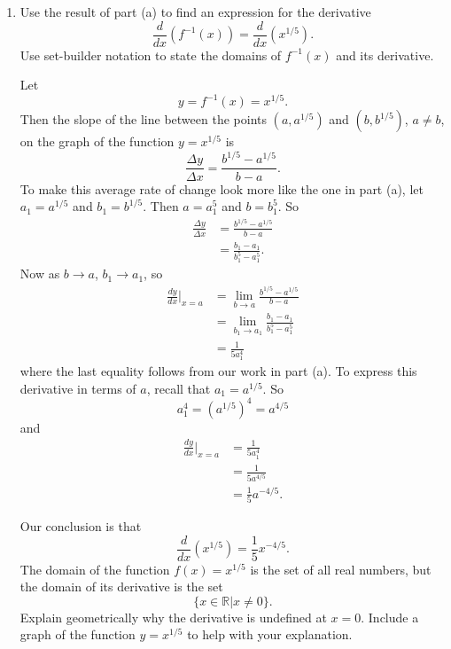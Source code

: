 \documentclass{ximera}
\begin{document}
\begin{question}
\begin{enumerate}
\item Use the result of part (a) to find an expression for the derivative
\[
    \frac{d}{dx}(f^{-1}(x)) =   \frac{d}{dx}\left( x^{1/5} \right) .
\]
Use set-builder notation to state the domains of $f^{-1}(x)$ and its derivative. 

\begin{explanation} 
Let
\[
        y = f^{-1}(x) =  x^{1/5}.
\] 
Then the slope of the line between the points $(a, a^{1/5})$ and $(b, b^{1/5})$, $a\neq b$, on the graph of the function $y=x^{1/5}$ is
\[
          \frac{\Delta y}{\Delta x} = \frac{b^{1/5} - a^{1/5}}{b - a}.
\]
To make this average rate of change look more like the one in part (a), let $a_1 = a^{1/5}$ and $b_1 = b^{1/5}$. Then $a = a_1^5$ and $b = b_1^5$. So
\begin{align*}
    \frac{\Delta y}{\Delta x} &= \frac{b^{1/5} - a^{1/5}}{b - a} \\
                                        &= \frac{b_1-a_1}{b_1^5 - a_1^5}.
\end{align*}
Now as $b\to a$, $b_1 \to a_1$, so
\begin{align*}
  \frac{dy}{dx}\Big|_{x=a} &= \lim_{b\to a}  \frac{b^{1/5} - a^{1/5}}{b - a} \\
                                        &= \lim_{b_1\to a_1} \frac{b_1-a_1}{b_1^5 - a_1^5} \\
                                       &= \frac{1}{5a_1^4}
\end{align*}
where the last equality follows from our work in part (a). To express this derivative in terms of $a$, recall that $a_1 = a^{1/5}$. So
\[
               a_1^4 =  \left( a^{1/5} \right)^4 = a^{4/5}
\]
and
\begin{align*}
  \frac{dy}{dx}\Big|_{x=a} &= \frac{1}{5a_1^4} \\
                                        &= \frac{1}{5a^{4/5}} \\
                                        &= \frac{1}{5}a^{-4/5} .
\end{align*}

Our conclusion is that
\[
   \frac{d}{dx}\left( x^{1/5} \right) = \frac{1}{5} x^{-4/5}.
\]
 The domain of the function $f(x) = x^{1/5}$ is the set of all real numbers, but the domain of its derivative is the set
\[
 \{ x\in \mathbb{R} | x \neq 0  \}.
\]
Explain geometrically why the derivative is undefined at $x=0$. Include a graph of the function $y=x^{1/5}$ to help with your explanation.
\begin{freeResponse}
\end{freeResponse}


\end{explanation}
\end{enumerate}
\end{question}
\end{document}
